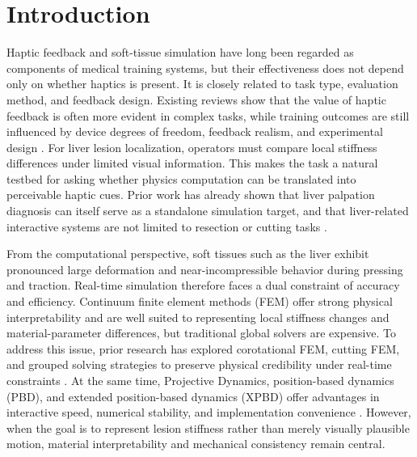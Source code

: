 \documentclass{ieeeaccess}
\begin{document}
\titlepgskip=-21pt
\maketitle

\section{Introduction}
Haptic feedback and soft-tissue simulation have long been regarded as components of medical training systems, but their effectiveness does not depend only on whether haptics is present. It is closely related to task type, evaluation method, and feedback design. Existing reviews show that the value of haptic feedback is often more evident in complex tasks, while training outcomes are still influenced by device degrees of freedom, feedback realism, and experimental design \cite{overtoom2019haptic,rangarajan2020systematic,escobar2016review}. For liver lesion localization, operators must compare local stiffness differences under limited visual information. This makes the task a natural testbed for asking whether physics computation can be translated into perceivable haptic cues. Prior work has already shown that liver palpation diagnosis can itself serve as a standalone simulation target, and that liver-related interactive systems are not limited to resection or cutting tasks \cite{westwood2012haptic,hongyu2021interactive}.

From the computational perspective, soft tissues such as the liver exhibit pronounced large deformation and near-incompressible behavior during pressing and traction. Real-time simulation therefore faces a dual constraint of accuracy and efficiency. Continuum finite element methods (FEM) offer strong physical interpretability and are well suited to representing local stiffness changes and material-parameter differences, but traditional global solvers are expensive. To address this issue, prior research has explored corotational FEM, cutting FEM, and grouped solving strategies to preserve physical credibility under real-time constraints \cite{bui2019corotational,wang2025group}. At the same time, Projective Dynamics, position-based dynamics (PBD), and extended position-based dynamics (XPBD) offer advantages in interactive speed, numerical stability, and implementation convenience \cite{bouaziz2023projective,liu2016towards,bender2014survey,muller2007position,macklin2016xpbd}. However, when the goal is to represent lesion stiffness rather than merely visually plausible motion, material interpretability and mechanical consistency remain central.
\end{document}

